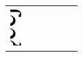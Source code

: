 \documentclass[10pt]{article}
\begin{document}
\begin{center}
\begin{tabular}{|c|c|c|c|c|c|}
\includegraphics[max width=\textwidth]{2024_11_21_72158d4a4efa7dd894bcg-25(1)}

\end{tabular}
\end{center}
\end{document}
